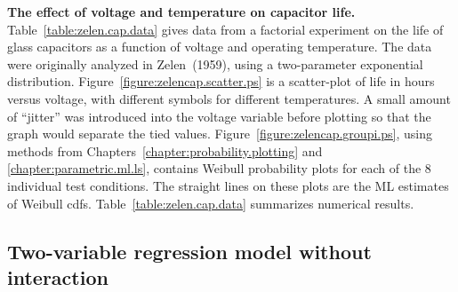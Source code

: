 
\begin{example}
\label{example:zelen.data}
{\bf The effect of voltage and temperature on capacitor life.}
Table~\ref{table:zelen.cap.data} gives data from a factorial
experiment on the life of glass capacitors as a function of
voltage and operating temperature.  The data were originally analyzed
in Zelen~(1959), using a two-parameter exponential distribution.
Figure~\ref{figure:zelencap.scatter.ps} is a scatter-plot of life in
hours versus voltage, with different symbols for different
temperatures. A small amount of ``jitter'' was introduced into the
voltage variable before plotting so that the graph would separate 
the tied values.  Figure~\ref{figure:zelencap.groupi.ps}, using 
methods from Chapters~\ref{chapter:probability.plotting} and
\ref{chapter:parametric.ml.ls}, contains 
Weibull probability plots for each of
the 8 individual test conditions. The straight lines on these plots
are the ML estimates of Weibull cdfs.
Table~\ref{table:zelen.cap.data} summarizes numerical results.
\end{example}
\subsection{Two-variable regression model without interaction}

